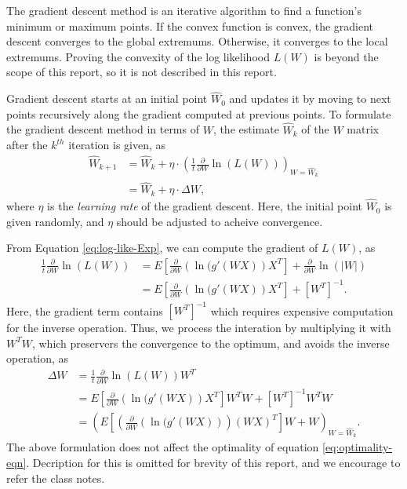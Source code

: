 \documentclass[conference]{IEEEtran}
\begin{document}
The gradient descent method is an iterative algorithm to find a function's minimum or maximum points. If the convex function is convex, the gradient descent converges to the global extremums. Otherwise, it converges to the local extremums. Proving the convexity of the log likelihood $L(W)$ is beyond the scope of this report, so it is not described in this report.

Gradient descent starts at an initial point $\hat{W}_0$ and updates it by moving to next points recursively along the gradient computed at previous points. To formulate the gradient descent method in terms of $W$, the estimate $\hat{W}_{k}$ of the $W$ matrix after the $k^{th}$ iteration is given, as 
\begin{equation}
\begin{aligned}
    \hat{W}_{k+1} &= \hat{W}_k + \eta\cdot\left(\frac{1}{t}\frac{\partial}{\partial W}\ln(L(W))\right)_{W=\hat{W}_k}\\
     &= \hat{W}_k + \eta\cdot\Delta W,
\end{aligned}
\end{equation}
where $\eta$ is the {\it learning rate} of the gradient descent.
Here, the initial point $\hat{W}_0$ is given randomly, and $\eta$ should be adjusted to acheive convergence.

From Equation \ref{eq:log-like-Exp}, we can compute the gradient of $L(W)$, as
\begin{equation}
\begin{aligned}
    \frac{1}{t}\frac{\partial}{\partial W}\ln(L(W)) 
    &= E\left[\frac{\partial}{\partial W}(\ln{(g'(WX)})X^T\right] + \frac{\partial}{\partial W}\ln{(|W|)} \\
    &= E\left[\frac{\partial}{\partial W}(\ln{(g'(WX)})X^T\right] + \left[W^T\right]^{-1}.
\end{aligned}
\end{equation}
Here, the gradient term contains $\left[W^T\right]^{-1}$ which requires expensive computation for the inverse operation. 
Thus, we process the interation by multiplying it with $W^TW$, which preservers the convergence to the optimum, and avoids the inverse operation, as
\begin{equation}
\begin{aligned}
    \Delta W
    &= \frac{1}{t}\frac{\partial}{\partial W}\ln(L(W)) W^T \\
    &= E\left[\frac{\partial}{\partial W}(\ln{(g'(WX)})X^T\right] W^TW + \left[W^T\right]^{-1} W^TW \\
    &= \left(E\left[\left(\frac{\partial}{\partial W}(\ln{(g'(WX)})\right)(WX)^T\right] W + W\right)_{W=\hat{W}_k}.
    \label{eq:delta W simplified}
\end{aligned}
\end{equation}
The above formulation does not affect the  optimality of equation \ref{eq:optimality-eqn}. Decription for this is omitted for brevity of this report, and we encourage to refer the class notes.
\end{document}
